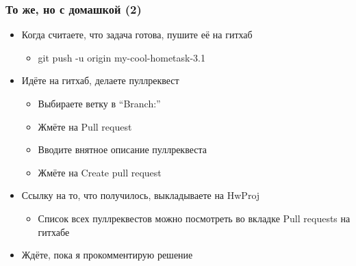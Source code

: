 \documentclass[xetex,mathserif,serif]{beamer}
\begin{document}
	\begin{frame}
		\frametitle{То же, но с домашкой (2)}
		\begin{itemize}
			\item Когда считаете, что задача готова, пушите её на гитхаб
			\begin{itemize}
				\item git push -u origin my-cool-hometask-3.1
			\end{itemize}
			\item Идёте на гитхаб, делаете пуллреквест
			\begin{itemize}
				\item Выбираете ветку в ``Branch:''
				\item Жмёте на Pull request
				\item Вводите внятное описание пуллреквеста
				\item Жмёте на Create pull request
			\end{itemize}
			\item Ссылку на то, что получилось, выкладываете на HwProj
			\begin{itemize}
				\item Список всех пуллреквестов можно посмотреть во вкладке Pull requests на гитхабе
			\end{itemize}
			\item Ждёте, пока я прокомментирую решение
		\end{itemize}
	\end{frame}
\end{document}
